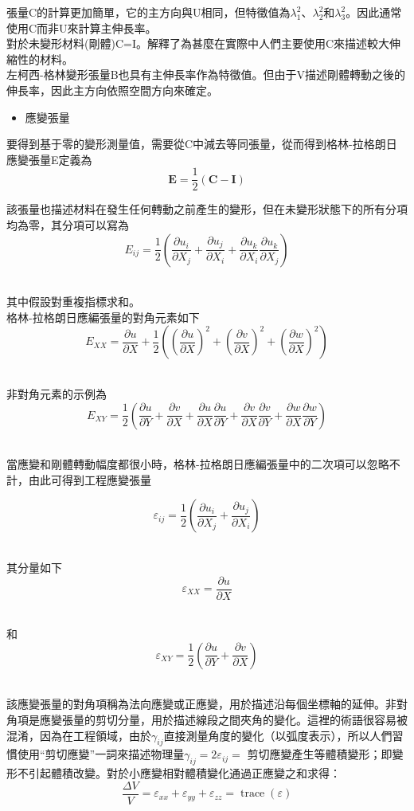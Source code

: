 張量C的計算更加簡單，它的主方向與U相同，但特徵值為$\lambda_1^2$、$\lambda_2^2$和$\lambda_3^2$。因此通常使用C而非U來計算主伸長率。\\

對於未變形材料(剛體)C=I。解釋了為甚麼在實際中人們主要使用C來描述較大伸縮性的材料。\\

左柯西-格林變形張量B也具有主伸長率作為特徵值。但由于V描述剛體轉動之後的伸長率，因此主方向依照空間方向來確定。\\

\begin{itemize}
\item 應變張量
\end{itemize}

要得到基于零的變形測量值，需要從C中減去等同張量，從而得到格林-拉格朗日應變張量E定義為\
$$\mathbf{E}=\frac{1}{2}(\mathbf{C}-\mathbf{I})$$

該張量也描述材料在發生任何轉動之前產生的變形，但在未變形狀態下的所有分項均為零，其分項可以寫為\
$$E_{i j}=\frac{1}{2}\left(\frac{\partial u_i}{\partial X_j}+\frac{\partial u_j}{\partial X_i}+\frac{\partial u_k}{\partial X_i} \frac{\partial u_k}{\partial X_j}\right)$$\

其中假設對重複指標求和。\\

格林-拉格朗日應編張量的對角元素如下\
$$E_{X X}=\frac{\partial u}{\partial X}+\frac{1}{2}\left(\left(\frac{\partial u}{\partial X}\right)^2+\left(\frac{\partial v}{\partial X}\right)^2+\left(\frac{\partial w}{\partial X}\right)^2\right)$$\

非對角元素的示例為\
$$E_{X Y}=\frac{1}{2}\left(\frac{\partial u}{\partial Y}+\frac{\partial v}{\partial X}+\frac{\partial u}{\partial X} \frac{\partial u}{\partial Y}+\frac{\partial v}{\partial X} \frac{\partial v}{\partial Y}+\frac{\partial w}{\partial X} \frac{\partial w}{\partial Y}\right)$$\

當應變和剛體轉動幅度都很小時，格林-拉格朗日應編張量中的二次項可以忽略不計，由此可得到工程應變張量\

$$\varepsilon_{i j}=\frac{1}{2}\left(\frac{\partial u_i}{\partial X_j}+\frac{\partial u_j}{\partial X_i}\right)$$\

其分量如下\
$$\varepsilon_{X X}=\frac{\partial u}{\partial X}$$\

和\
$$\varepsilon_{X Y}=\frac{1}{2}\left(\frac{\partial u}{\partial Y}+\frac{\partial v}{\partial X}\right)$$\

該應變張量的對角項稱為法向應變或正應變，用於描述沿每個坐標軸的延伸。非對角項是應變張量的剪切分量，用於描述線段之間夾角的變化。這裡的術語很容易被混淆，因為在工程領域，由於$\gamma_{i j}$直接測量角度的變化（以弧度表示），所以人們習慣使用“剪切應變”一詞來描述物理量$\gamma_{i j}=2 \varepsilon_{i j}=$
剪切應變產生等體積變形；即變形不引起體積改變。對於小應變相對體積變化通過正應變之和求得：\
$$\frac{\Delta V}{V}=\varepsilon_{x x}+\varepsilon_{y y}+\varepsilon_{z z}=\operatorname{trace}(\varepsilon)$$

